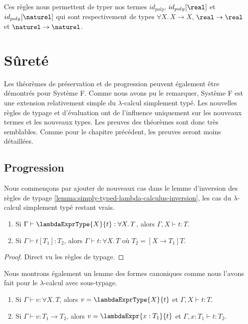 Ces règles nous permettent de typer nos termes $id_{poly}$, $id_{poly}[\real]$ et
$id_{poly}[\naturel]$ qui sont respectivement de types $\forall X . \, X
\rightarrow X$, $\real \rightarrow \real$ et $\naturel \rightarrow \naturel$.

\section{Sûreté}

Les théorèmes de préservation et de progression peuvent également être démontrés
pour Système F. Comme nous avons pu le remarquer, Système F est une extension
relativement simple du $\lambda$-calcul simplement typé. Les nouvelles règles de typage
et d'évaluation ont de l'influence uniquement sur les nouveaux termes et les
nouveaux types. Les preuves des théorèmes sont donc très semblables. Comme pour
le chapitre précédent, les preuves seront moins détaillées.

\subsection*{Progression}

Nous commençons par ajouter de nouveaux cas dans le lemme d'inversion des règles
de typage \ref{lemma:simply-typed-lambda-calculus-inversion}, les cas du
$\lambda$-calcul simplement typé restant vrais.

\begin{lemma} 
  \begin{enumerate}
    \item Si $\Gamma \vdash \lambdaExprType{X}{t} : \forall X . \, T$, alors
      $\Gamma, X \vdash t : T$.
    \item Si $\Gamma \vdash t[T_{1}] : T_{2}$, alors $\Gamma \vdash t : \forall X .
      \, T$ où $T_{2} = [X \rightarrow T_{1}] T$.
  \end{enumerate}
\end{lemma}
  
\begin{proof}
  Direct vu les règles de typage.
\end{proof}

Nous montrons également un lemme des formes canoniques comme nous l'avons fait
pour le $\lambda$-calcul avec sous-typage.

\begin{lemma} 
  \begin{enumerate}
  \item Si $\Gamma \vdash v : \forall X . \, T$, alors $v =
    \lambdaExprType{X}{t}$ et $\Gamma, X \vdash t : T$.
  \item Si $\Gamma \vdash v : T_{1} \rightarrow T_{2}$, alors $v =
    \lambdaExpr{x : T_{1}}{t}$ et $\Gamma, x : T_{1} \vdash t : T_{2}$.
  \end{enumerate}
\end{lemma}


